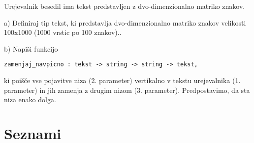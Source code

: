 \begin{ex}
  Urejevalnik besedil ima tekst predstavljen z dvo-dimenzionalno
  matriko znakov.

  a) Definiraj tip tekst, ki predstavlja dvo-dimenzionalno matriko
  znakov velikosti 100x1000 (1000 vrstic po 100 znakov)..

  b) Napi\v si funkcijo

\begin{verbatim}
zamenjaj_navpicno : tekst -> string -> string -> tekst, 
\end{verbatim}

  ki poi\v s\v ce vse pojavitve niza (2. parameter) vertikalno v
  tekstu urejevalnika (1. parameter) in jih zamenja z drugim nizom
  (3. parameter). Predpostavimo, da sta niza enako dolga.


\end{ex} 


\section{Seznami}

